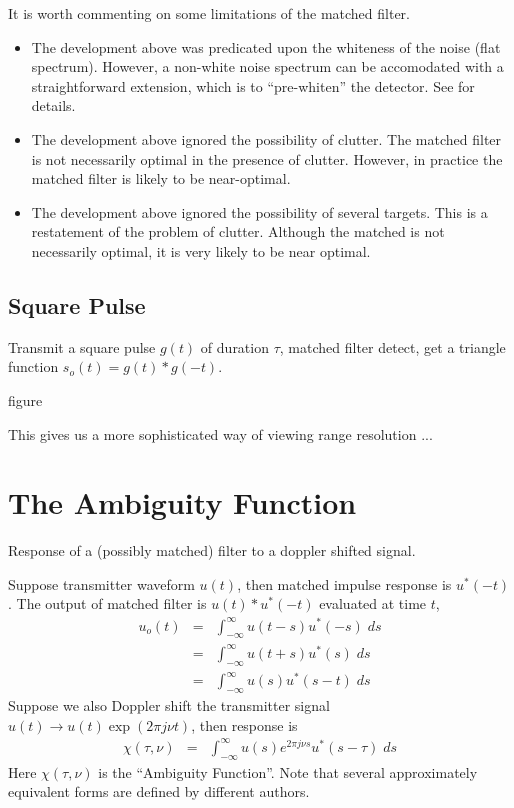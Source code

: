 It is worth commenting on some limitations of the matched filter.
\begin{itemize}
\item The development above was predicated upon the whiteness of the
noise (flat spectrum).  However, a non-white noise spectrum can be
accomodated with a straightforward extension, which is to
``pre-whiten'' the detector.  See \cite{whalen-1971} for details.
\item The development above ignored the possibility of clutter.  The
matched filter is not necessarily optimal in the presence of
clutter.  However, in practice the matched filter is likely to be
near-optimal.
\item The development above ignored the possibility of several
targets.  This is a restatement of the problem of clutter.  Although
the matched is not necessarily optimal, it is very likely to be near
optimal.
\end{itemize}

\subsection{Square Pulse}

Transmit a square pulse $g(t)$ of duration $\tau$, matched filter
detect, get a triangle function $s_o(t) = g(t)\ast g(-t)$.

\centerline{figure}

This gives us a more sophisticated way of viewing range resolution
... 

\section{The Ambiguity Function}

\newcommand{\infint}{\int_{-\infty}^\infty}

Response of a (possibly matched) filter to a doppler shifted signal.

Suppose transmitter waveform $u(t)$, then matched impulse response is
$u^\ast(-t)$.  The output of matched filter is $u(t) \ast u^\ast(-t)$
evaluated at time $t$,
\begin{eqnarray}
u_o(t) &=& \infint u(t-s) u^\ast(-s) \; ds \\
&=& \infint u(t+s) u^\ast(s) \; ds \\
&=& \infint u(s) u^\ast(s-t) \; ds %
\end{eqnarray}
Suppose we also Doppler shift the transmitter signal $u(t) \rightarrow
u(t) \exp(2\pi j \nu t)$, then response is
\begin{eqnarray}
\chi(\tau,\nu) &=& \infint u(s) e^{2\pi j \nu s} u^\ast(s-\tau)\;
ds  \label{e:AF-def}
\end{eqnarray}
Here $\chi(\tau,\nu)$ is the ``Ambiguity Function''.  Note that several approximately equivalent forms are
defined by different authors.

